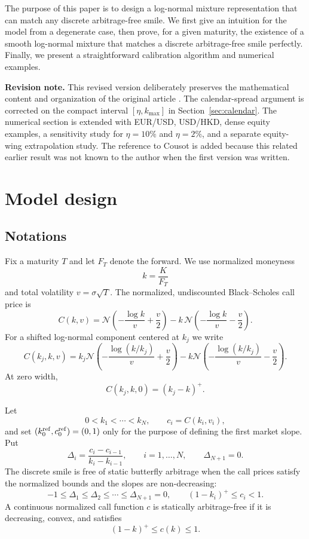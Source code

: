 \documentclass[11pt]{article}
\newcommand{\Ncdf}{\mathcal{N}}
\begin{document}
The purpose of this paper is to design a log-normal mixture representation that can match any discrete arbitrage-free smile. We first give an intuition for the model from a degenerate case, then prove, for a given maturity, the existence of a smooth log-normal mixture that matches a discrete arbitrage-free smile perfectly. Finally, we present a straightforward calibration algorithm and numerical examples.

\textbf{Revision note.} This revised version deliberately preserves the mathematical content and organization of the original article \cite{elalaoui2023}. The calendar-spread argument is corrected on the compact interval $[\eta,k_{\max}]$ in Section~\ref{sec:calendar}. The numerical section is extended with EUR/USD, USD/HKD, dense equity examples, a sensitivity study for $\eta=10\%$ and $\eta=2\%$, and a separate equity-wing extrapolation study. The reference to Cousot \cite{cousot2007} is added because this related earlier result was not known to the author when the first version was written.

\section{Model design}
\subsection{Notations}
Fix a maturity $T$ and let $F_T$ denote the forward. We use normalized moneyness
\[
    k=\frac{K}{F_T}
\]
and total volatility $v=\sigma\sqrt{T}$. The normalized, undiscounted Black--Scholes call price is
\begin{equation}
C(k,v)=\Ncdf\!\left(-\frac{\log k}{v}+\frac{v}{2}\right)
-k\,\Ncdf\!\left(-\frac{\log k}{v}-\frac{v}{2}\right).
\label{eq:bs}
\end{equation}
For a shifted log-normal component centered at $k_j$ we write
\begin{equation}
C(k_j,k,v)
=k_j\Ncdf\!\left(-\frac{\log(k/k_j)}{v}+\frac{v}{2}\right)
-k\Ncdf\!\left(-\frac{\log(k/k_j)}{v}-\frac{v}{2}\right).
\label{eq:shifted-bs}
\end{equation}
At zero width,
\begin{equation}
C(k_j,k,0)=(k_j-k)^+.
\label{eq:zero-width}
\end{equation}

Let
\[
0<k_1<\cdots<k_N,
\qquad c_i=C(k_i,v_i),
\]
and set $(k_0^{\rm ref},c_0^{\rm ref})=(0,1)$ only for the purpose of defining the first market slope. Put
\[
\Delta_i=\frac{c_i-c_{i-1}}{k_i-k_{i-1}},\qquad i=1,\ldots,N,
\qquad \Delta_{N+1}=0.
\]
The discrete smile is free of static butterfly arbitrage when the call prices satisfy the normalized bounds and the slopes are non-decreasing:
\begin{equation}
-1\le \Delta_1\le\Delta_2\le\cdots\le\Delta_{N+1}=0,
\qquad
(1-k_i)^+\le c_i<1.
\label{eq:discrete-arb}
\end{equation}
A continuous normalized call function $c$ is statically arbitrage-free if it is decreasing, convex, and satisfies
\[
(1-k)^+\le c(k)\le1.
\]
\end{document}
